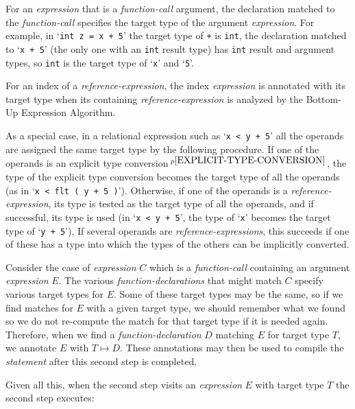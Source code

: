 \documentclass[12pt]{article}
\newcommand{\pagnote}[1]{$\,^{p\pageref{#1}}$}
\begin{document}
For an {\em expression} that is a {\em function-call} argument,
the declaration matched to the {\em function-call} specifies the
target type of the argument {\em expression}.  For example, in
`{\tt int z = x + 5}' the target type of {\tt +} is {\tt int},
the declaration matched to `{\tt x +  5}' (the only one with an {\tt int}
result type) has {\tt int} result
and argument types, so {\tt int} is the target type of `{\tt x}' and `{\tt 5}'.

For an index of a {\em reference-expression}, the
index {\em expression} is annotated with its target type when its
containing {\em reference-expression} is analyzed by the Bottom-Up
Expression Algorithm.

As a special case, in a relational expression such as `{\tt x < y + 5}'
all the operands are assigned the same target type by the following
procedure.
If one of the operands is
an explicit type conversion\pagnote{EXPLICIT-TYPE-CONVERSION},
the type of the explicit type conversion
becomes the target type of all the operands
(as in `{\tt x < flt ( y + 5 )}').
Otherwise, if
one of the operands is a {\em reference-expression},
its type is tested as the target type of all the operands,
and if successful, its type is used
(in `{\tt x < y + 5}',
the type of `{\tt x}' becomes the target type of `{\tt y + 5}'),
If several operands are {\em reference-expressions}, this succeeds if
one of these has a type into which the types of the others can be
implicitly converted.

Consider the case of {\em expression} $C$ which is a {\em function-call}
containing an argument {\em expression} $E$.  The various
{\em function-declarations} that might match $C$ specify various
target types for $E$.  Some of these target types may be the same,
so if we find matches for $E$ with a given target type, we should
remember what we found so we do not re-compute the match for
that target type if it is needed again.  Therefore, when we find a
{\em function-declaration} $D$ matching $E$ for target type $T$, we annotate
$E$ with $T\mapsto D$.  These annotations may then be used to compile
the {\em statement} after this second step is completed.

Given all this, when the second step visits an {\em expression} $E$ with
target type $T$ the second step executes:


\bigskip
\end{document}
